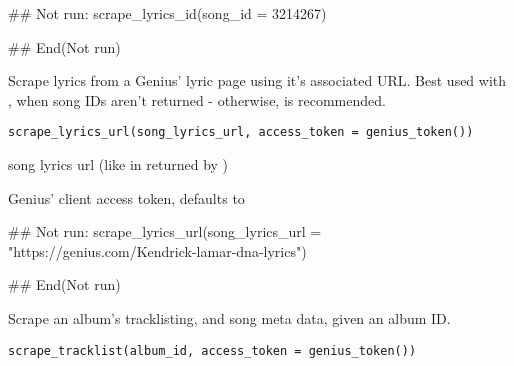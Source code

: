 \documentclass[a4paper]{book}
\begin{document}
%
\begin{Examples}
\begin{ExampleCode}
## Not run: 
scrape_lyrics_id(song_id = 3214267)

## End(Not run)
\end{ExampleCode}
\end{Examples}
%
\begin{Description}\relax
Scrape lyrics from a Genius' lyric page using it's associated URL. Best used with , when song IDs aren't returned - otherwise,  is recommended.
\end{Description}
%
\begin{Usage}
\begin{verbatim}
scrape_lyrics_url(song_lyrics_url, access_token = genius_token())
\end{verbatim}
\end{Usage}
%
\begin{Arguments}
\begin{ldescription}
\item[\code{song\_lyrics\_url}] song lyrics url (like in  returned by )

\item[\code{access\_token}] Genius' client access token, defaults to 
\end{ldescription}
\end{Arguments}
%
\begin{Examples}
\begin{ExampleCode}
## Not run: 
scrape_lyrics_url(song_lyrics_url = "https://genius.com/Kendrick-lamar-dna-lyrics")

## End(Not run)
\end{ExampleCode}
\end{Examples}
%
\begin{Description}\relax
Scrape an album's tracklisting, and song meta data, given an album ID.
\end{Description}
%
\begin{Usage}
\begin{verbatim}
scrape_tracklist(album_id, access_token = genius_token())
\end{verbatim}
\end{Usage}
\end{document}
